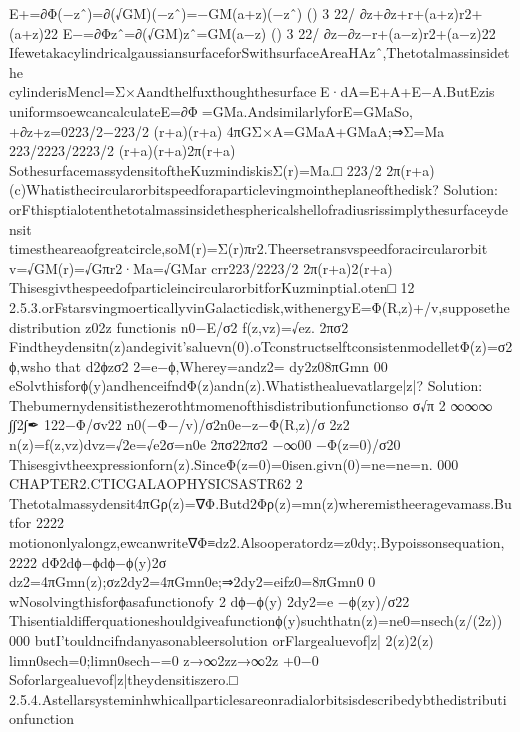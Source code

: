 E+=∂Φ(−zˆ)=∂(√GM)(−zˆ)=−GM(a+z)(−zˆ)
()
3
22/
∂z+∂z+r+(a+z)r2+(a+z)22
E−=∂Φzˆ=∂(√GM)zˆ=GM(a−z)
()
3
22/
∂z−∂z−r+(a−z)r2+(a−z)22
IfewetakacylindricalgaussiansurfaceforSwithsurfaceAreaHAzˆ,Thetotalmassinsidethe
cylinderisMencl=Σ×AandthelfuxthoughthesurfaceE·dA=E+A+E−A.ButEzis
uniformsoewcancalculateE=∂Φ=GMa.AndsimilarlyforE=GMaSo,
+∂z+z=0223/2−223/2
(r+a)(r+a)
4πGΣ×A=GMaA+GMaA;⇒Σ=Ma
223/2223/2223/2
(r+a)(r+a)2π(r+a)
SothesurfacemassydensitoftheKuzmindiskisΣ(r)=Ma.□
223/2
2π(r+a)
(c)Whatisthecircularorbitspeedforaparticlevingmointheplaneofthedisk?
Solution:
orFthisptialotenthetotalmassinsidethesphericalshellofradiusrissimplythesurfaceydensit
timestheareaofgreatcircle,soM(r)=Σ(r)πr2.Theersetransvspeedforacircularorbit
v=√GM(r)=√Gπr2·Ma=√GMar
crr223/2223/2
2π(r+a)2(r+a)
ThisesgivthespeedofparticleincircularorbitforKuzminptial.oten□
12
2.5.3.orFstarsvingmoerticallyvinGalacticdisk,withenergyE=Φ(R,z)+/v,supposethedistribution
z02z
functionis
n0−E/σ2
f(z,vz)=√ez.
2πσ2
Findtheydensitn(z)andegivit’saluevn(0).oTconstructselftconsistenmodelletΦ(z)=σ2ϕ,wsho
that
d2ϕzσ2
2=e−ϕ,Wherey=andz2=
dy2z08πGmn
00
eSolvthisforϕ(y)andhenceifndΦ(z)andn(z).Whatisthealuevatlarge|z|?
Solution:
Thebumernydensitisthezerothtmomenofthisdistributionfunctionso
σ√π
2
∞∞∞
∫∫2∫ ✒
 
122−Φ/σv22
n0(−Φ−/v)/σ2n0e−z−Φ(R,z)/σ
2z 2
n(z)=f(z,vz)dvz=√2e=√e2σ=n0e
2πσ22πσ2 
−∞00
 
−Φ(z=0)/σ20
Thisesgivtheexpressionforn(z).SinceΦ(z=0)=0isen.givn(0)=ne=ne=n.
000
CHAPTER2.CTICGALAOPHYSICSASTR62
2
Thetotalmassydensit4πGρ(z)=∇Φ.Butd2Φρ(z)=mn(z)wheremistheeragevamass.Butfor
2222
motiononlyalongz,ewcanwrite∇Φ≡dz2.Alsooperatordz=z0dy;.Bypoissonsequation,
2222
dΦ2dϕ−ϕdϕ−ϕ(y)2σ
dz2=4πGmn(z);σz2dy2=4πGmn0e;⇒2dy2=eifz0=8πGmn0
0
wNosolvingthisforϕasafunctionofy
2
dϕ−ϕ(y)
2dy2=e
−ϕ(zy)/σ22
Thisentialdifferquationeshouldgiveafunctionϕ(y)suchthatn(z)=ne0=nsech(z/(2z))
000
butI’touldncifndanyasonableersolution
orFlargealuevof|z|
2(z)2(z)
limn0sech=0;limn0sech−=0
z→∞2zz→∞2z
+0−0
Soforlargealuevof|z|theydensitiszero.□
2.5.4.Astellarsysteminhwhicallparticlesareonradialorbitsisdescribedybthedistributionfunction

